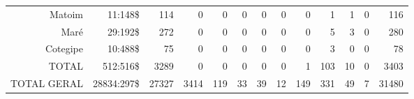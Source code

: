 \begin{sidewaystable*}[!htp]
{\begin{tiny}
\begin{tabular}{rrrrrrrrrrrrr}
Matoim	&11:148\$	&114	&0	&0	&0	&0	&0	&0	&1	&1	&0	&116\\
Maré	&29:192\$	&272	&0	&0	&0	&0	&0	&0	&5	&3	&0	&280\\
Cotegipe	&10:488\$	&75	&0	&0	&0	&0	&0	&0	&3	&0	&0	&78\\
TOTAL 	&512:516\$	&3289	&0	&0	&0	&0	&0	&1	&103	&10	&0	&3403\\
\hline
TOTAL GERAL	&28834:297\$	&27327	&3414	&119	&33	&39	&12	&149	&331	&49	&7	&31480\\
\hline
\end{tabular} 
\end{tiny}
}
{}
\end{sidewaystable*}